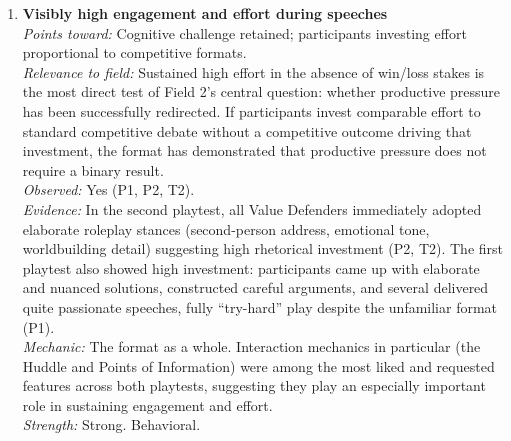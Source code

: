 \begin{enumerate}

\item \textbf{Visibly high engagement and effort during speeches}\\
\textit{Points toward:} Cognitive challenge retained; participants investing effort proportional to competitive formats.\\
\textit{Relevance to field:} Sustained high effort in the absence of win/loss stakes is the most direct test of Field 2's central question: whether productive pressure has been successfully redirected. If participants invest comparable effort to standard competitive debate without a competitive outcome driving that investment, the format has demonstrated that productive pressure does not require a binary result.\\
\textit{Observed:} Yes (P1, P2, T2).\\
\textit{Evidence:} In the second playtest, all Value Defenders immediately adopted elaborate roleplay stances (second-person address, emotional tone, worldbuilding detail) suggesting high rhetorical investment (P2, T2). The first playtest also showed high investment: participants came up with elaborate and nuanced solutions, constructed careful arguments, and several delivered quite passionate speeches, fully ``try-hard'' play despite the unfamiliar format (P1).\\
\textit{Mechanic:} The format as a whole. Interaction mechanics in particular (the Huddle and Points of Information) were among the most liked and requested features across both playtests, suggesting they play an especially important role in sustaining engagement and effort.\\
\textit{Strength:} Strong. Behavioral.


\end{enumerate}
